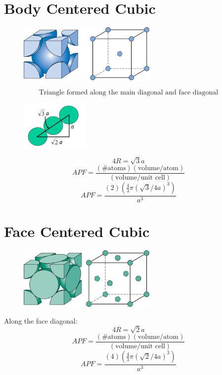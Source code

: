 \documentclass[12pt]{article}
\begin{document}
\section*{Body Centered Cubic}
\begin{figure}[H]
    \centering
    \includegraphics[width=0.6\textwidth]{BCC.png}
\end{figure}
\[\text{Triangle formed along the main diagonal and face diagonal}\]
\begin{figure}[H]
    \centering
    \includegraphics[width=0.3\textwidth]{BCC diag.png}
\end{figure}
\[4R=\sqrt{3}a\]
\[APF=\frac{(\text{\# atoms})(\text{volume/atom})}{(\text{volume/unit cell})}\]
\[APF=\frac{(2)(\frac{4}{3}\pi(\sqrt{3}/4a )^3)}{a^3}\]
\newpage

\section*{Face Centered Cubic}
\begin{figure}[H]
    \centering
    \includegraphics[width=0.6\textwidth]{FCC.png}
\end{figure}
Along the face diagonal:
\[4R=\sqrt{2}a\]
\[APF=\frac{(\text{\# atoms})(\text{volume/atom})}{(\text{volume/unit cell})}\]
\[APF=\frac{(4)(\frac{4}{3}\pi(\sqrt{2}/4a )^3)}{a^3}\]
\newpage
\end{document}

